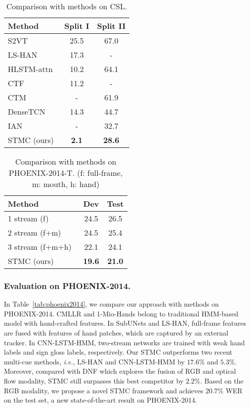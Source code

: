 \documentclass[letterpaper]{article} \usepackage{aaai20}  \usepackage{times}  \usepackage{helvet} \usepackage{courier}  \usepackage[hyphens]{url}  \usepackage{graphicx} \urlstyle{rm} \def\UrlFont{\rm}  \usepackage{graphicx}  \frenchspacing  \setlength{\pdfpagewidth}{8.5in}  \setlength{\pdfpageheight}{11in}
\begin{document}
\begin{table}[tp]
    \centering
    \small
    \caption{Comparison with methods on CSL.} \label{tab:CSL}
    \begin{tabular}{l|c|c}
    \hline
    Method                          & Split I & Split II  \\ \hline
    S2VT~\cite{s2vt-v}              & 25.5    & 67.0      \\
    LS-HAN~\cite{han}               & 17.3    &  -        \\
    HLSTM-attn~\cite{hlstm}         & 10.2    & 64.1      \\
    CTF~\cite{MM}                   & 11.2    &  -        \\ 
    CTM~\cite{ctm}                  &  -      & 61.9      \\
    DenseTCN~\cite{densetcn}        & 14.3    & 44.7      \\
    IAN~\cite{ian}                  &  -      & 32.7      \\ \hline
    STMC (ours)                     & \textbf{2.1}     & \textbf{28.6}      \\ \hline
    \end{tabular}
\end{table}


\begin{table}[tp]
    \centering
    \small
    \caption{Comparison with methods on PHOENIX-2014-T. (f: full-frame, m: mouth, h: hand)} \label{tab:phoenix-2014-t}
    \begin{tabular}{l|c|c}
    \hline
    Method                              & Dev & Test  \\ \hline
    1 stream (f)~\cite{tpami19}         & 24.5    & 26.5      \\
    2 stream (f+m)~\cite{tpami19}       & 24.5    & 25.4      \\
    3 stream (f+m+h)~\cite{tpami19}     & 22.1    & 24.1      \\ \hline
    STMC (ours)                         & \textbf{19.6}     & \textbf{21.0}      \\ \hline
    \end{tabular}
\end{table}


\subsubsection{Evaluation on PHOENIX-2014.} In Table~\ref{tab:phoenix2014}, we compare our approach with methods on PHOENIX-2014. 
CMLLR and 1-Mio-Hands belong to traditional HMM-based model with hand-crafted features. In SubUNets and LS-HAN, full-frame features are fused with features of hand patches, which are captured by an external tracker. In CNN-LSTM-HMM, two-stream networks are trained with weak hand labels and sign gloss labels, respectively. Our STMC outperforms two recent multi-cue methods, \emph{i.e.}, LS-HAN and CNN-LSTM-HMM by $17.6\%$ and $5.3\%$. Moreover, compared with DNF which explores the fusion of RGB and optical flow modality, STMC still surpasses this best competitor by $2.2\%$. Based on the RGB modality, we propose a novel STMC framework and achieves $20.7\%$ WER on the test set, a new state-of-the-art result on PHOENIX-2014.
\end{document}
